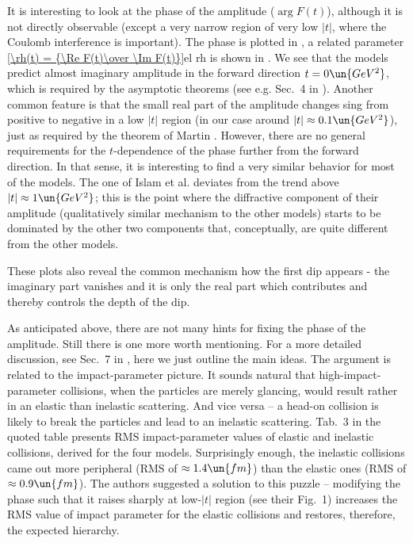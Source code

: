 It is interesting to look at the phase of the amplitude ($\arg F(t)$), although it is not directly observable (except a very narrow region of very low $|t|$, where the Coulomb interference is important). The phase is plotted in , a related parameter 
\eqref{\rh(t) = {\Re F(t)\over \Im F(t)}}{el rh}
is shown in . We see that the models predict almost imaginary amplitude in the forward direction $t=0\un{GeV^2}$, which is required by the asymptotic theorems (see e.g. Sec.~4 in ). Another common feature is that the small real part of the amplitude changes sing from positive to negative in a low $|t|$ region (in our case around $|t| \approx 0.1\un{GeV^2}$), just as required by the theorem of Martin . However, there are no general requirements for the $t$-dependence of the phase further from the forward direction. In that sense, it is interesting to find a very similar behavior for most of the models. The one of Islam et al. deviates from the trend above $|t|\approx 1\un{GeV^2}$; this is the point where the diffractive component of their amplitude (qualitatively similar mechanism to the other models) starts to be dominated by the other two components that, conceptually, are quite different from the other models.

These plots also reveal the common mechanism how the first dip appears - the imaginary part vanishes and it is only the real part which contributes and thereby controls the depth of the dip.



As anticipated above, there are not many hints for fixing the phase of the amplitude. Still there is one more worth mentioning. For a more detailed discussion, see Sec.~7 in , here we just outline the main ideas. The argument is related to the impact-parameter picture. It sounds natural that high-impact-parameter collisions, when the particles are merely glancing, would result rather in an elastic than inelastic scattering. And vice versa -- a head-on collision is likely to break the particles and lead to an inelastic scattering. Tab.~3 in the quoted table presents RMS impact-parameter values of elastic and inelastic collisions, derived for the four models. Surprisingly enough, the inelastic collisions came out more peripheral (RMS of $\approx 1.4\un{fm}$) than the elastic ones (RMS of $\approx 0.9\un{fm}$). The authors suggested a solution to this puzzle -- modifying the phase such that it raises sharply at low-$|t|$ region (see their Fig.~1) increases the RMS value of impact parameter for the elastic collisions and restores, therefore, the expected hierarchy.

